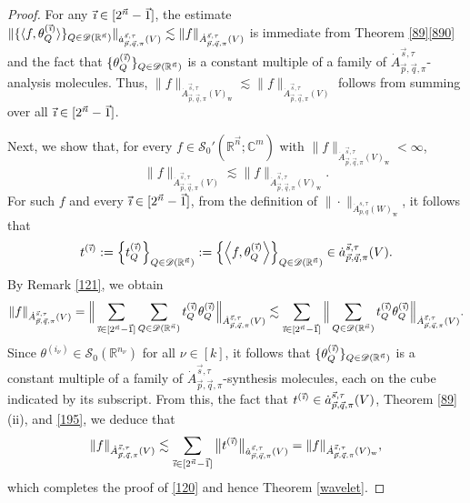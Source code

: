 \documentclass[11pt, reqno]{amsart}
\theoremstyle{definition}
\theoremstyle{remark}
\numberwithin{equation}{section}
\newcommand{\C}{\mathbb C}
\newcommand{\D}{\mathscr D}
\newcommand{\R}{\mathbb R}
\newcommand{\vi}{\vec{\textit{\i}}}
\newcommand{\vn}{\vec n}
\begin{document}
\begin{proof}
For any $\vi\in[2^{\vn}-\vec1]$, the estimate
$\|\{\langle f,\theta^{(\vi)}_Q\rangle\}_{Q\in\mathscr{D}(\mathbb R^{\vec n})}\|_{\dot a^{\vec s,\tau}_{\vec p,\vec q,\pi}(V)}
\lesssim\| f\|_{\dot A^{\vec s,\tau}_{\vec p,\vec q,\pi}(V)}$
is immediate from Theorem \ref{89}\eqref{890} and the fact that
$\{\theta^{(\vi)}_Q\}_{Q\in\D(\R^{\vn})}$ is a
constant multiple of a family of
$\dot A^{\vec s,\tau}_{\vec p,\vec q,\pi}$-analysis molecules.
Thus, $\|f\|_{\dot A^{\vec s,\tau}_{\vec p,\vec q,\pi}(V)_\mathrm{w}}
\lesssim \| f\|_{\dot A^{\vec s,\tau}_{\vec p,\vec q,\pi}(V)}$
follows from summing over all $\vi\in[2^{\vn}-\vec1]$.

Next, we show that, for every $f\in\mathscr{S}_0'(\R^{\vn};\C^m)$
with $\|f\|_{\dot A^{\vec s,\tau}_{\vec p,\vec q,\pi}(V)_\mathrm{w}}<\infty$,
\begin{equation}\label{120}
\|f\|_{\dot A^{\vec s,\tau}_{\vec p,\vec q,\pi}(V)}
\lesssim\|f\|_{\dot A^{\vec s,\tau}_{\vec p,\vec q,\pi}(V)_\mathrm{w}}.
\end{equation}
For such $f$ and every $\vi\in[2^{\vn}-\vec1]$,
from the definition of $\|\cdot\|_{\dot A_{p,q}^{s,\tau}(W)_\mathrm{w}}$,
it follows that
\begin{equation*}
t^{(\vi)}
:=\Big\{t^{(\vi)}_Q \Big\}_{Q\in\D(\R^{\vn})}
:=\Big\{\Big\langle f,
\theta^{(\vi)}_Q\Big\rangle\Big\}_{Q\in\D(\R^{\vn})}
\in\dot a^{\vec s,\tau}_{\vec p,\vec q,\pi}(V).
\end{equation*}
By Remark \ref{121}, we obtain
\begin{equation}\label{195}
\|f\|_{\dot A^{\vec s,\tau}_{\vec p,\vec q,\pi}(V)}
=\Big\|\sum_{\vi\in[2^{\vn}-\vec1]}\sum_{Q\in\mathscr{D}(\R^{\vn})}
t^{(\vi)}_Q \theta^{(\vi)}_Q\Big\|_{\dot A^{\vec s,\tau}_{\vec p,\vec q,\pi}(V)}
\lesssim\sum_{\vi\in[2^{\vn}-\vec1]}\Big\|\sum_{Q\in\mathscr{D}(\R^{\vn})}
t^{(\vi)}_Q \theta^{(\vi)}_Q\Big\|_{\dot A^{\vec s,\tau}_{\vec p,\vec q,\pi}(V)}.
\end{equation}
Since $\theta^{(i_\nu)}\in \mathscr{S}_0(\R^{n_\nu})$ for all $\nu\in[k]$,
it follows that $\{\theta^{(\vi)}_Q\}_{Q\in\mathscr{D}(\R^{\vn})}$ is a constant multiple of
a family of $\dot A^{\vec s,\tau}_{\vec p,\vec q,\pi}$-synthesis molecules,
each on the cube indicated by its subscript.
From this, the fact that $t^{(\vi)}\in\dot a^{\vec s,\tau}_{\vec p,\vec q,\pi}(V)$, Theorem \ref{89}(ii),
and \eqref{195}, we deduce that
$$
\|f\|_{\dot A^{\vec s,\tau}_{\vec p,\vec q,\pi}(V)}
\lesssim\sum_{\vi\in[2^{\vn}-\vec1]}\big\|t^{(\vi)}\big\|_{\dot a^{\vec s,\tau}_{\vec p,\vec q,\pi}(V)}
=\|f\|_{\dot A^{\vec s,\tau}_{\vec p,\vec q,\pi}(V)_\mathrm{w}},
$$
which completes the proof of \eqref{120}
and hence Theorem \ref{wavelet}.
\end{proof}
\end{document}
